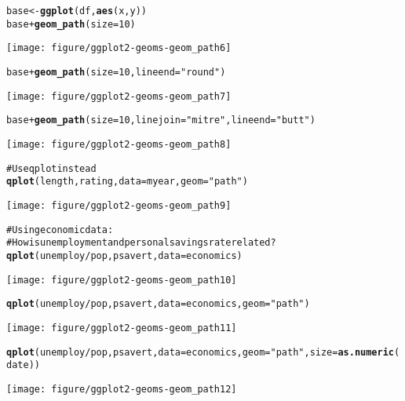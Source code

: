 \documentclass[a4paper,titlepage]{tufte-handout}\usepackage{graphicx, color}
\makeatletter
\def\maxwidth{ %
  \ifdim\Gin@nat@width>\linewidth
    \linewidth
  \else
    \Gin@nat@width
  \fi
}
\newcommand{\hlfunctioncall}[1]{\textcolor[rgb]{0.501960784313725,0,0.329411764705882}{\textbf{#1}}}%
\newcommand{\hlstring}[1]{\textcolor[rgb]{0.6,0.6,1}{#1}}%
\newcommand{\hlcomment}[1]{\textcolor[rgb]{0.180392156862745,0.6,0.341176470588235}{#1}}%
\newenvironment{kframe}{%
 \def\at@end@of@kframe{}%
 \ifinner\ifhmode%
  \def\at@end@of@kframe{\end{minipage}}%
  \begin{minipage}{\columnwidth}%
 \fi\fi%
 \def\FrameCommand##1{\hskip\@totalleftmargin \hskip-\fboxsep
 \colorbox{shadecolor}{##1}\hskip-\fboxsep
     \hskip-\linewidth \hskip-\@totalleftmargin \hskip\columnwidth}%
 \MakeFramed {\advance\hsize-\width
   \@totalleftmargin\z@ \linewidth\hsize
   \@setminipage}}%
 {\par\unskip\endMakeFramed%
 \at@end@of@kframe}
\newenvironment{knitrout}{}{} %
\makeatother
\begin{document}
\begin{knitrout}
\begin{kframe}
\begin{alltt}
base <- \hlfunctioncall{ggplot}(df, \hlfunctioncall{aes}(x, y))
base + \hlfunctioncall{geom_path}(size = 10)
\end{alltt}
\end{kframe}\texttt{[image: figure/ggplot2-geoms-geom\_path6]} \begin{kframe}\begin{alltt}
base + \hlfunctioncall{geom_path}(size = 10, lineend = \hlstring{"round"})
\end{alltt}
\end{kframe}\texttt{[image: figure/ggplot2-geoms-geom\_path7]} \begin{kframe}\begin{alltt}
base + \hlfunctioncall{geom_path}(size = 10, linejoin = \hlstring{"mitre"}, lineend = \hlstring{"butt"})
\end{alltt}
\end{kframe}\texttt{[image: figure/ggplot2-geoms-geom\_path8]} \begin{kframe}\begin{alltt}
\hlcomment{# Use qplot instead}
\hlfunctioncall{qplot}(length, rating, data=myear, geom=\hlstring{"path"})
\end{alltt}
\end{kframe}\texttt{[image: figure/ggplot2-geoms-geom\_path9]} \begin{kframe}\begin{alltt}
\hlcomment{# Using economic data:}
\hlcomment{# How is unemployment and personal savings rate related?}
\hlfunctioncall{qplot}(unemploy/pop, psavert, data=economics)
\end{alltt}
\end{kframe}\texttt{[image: figure/ggplot2-geoms-geom\_path10]} \begin{kframe}\begin{alltt}
\hlfunctioncall{qplot}(unemploy/pop, psavert, data=economics, geom=\hlstring{"path"})
\end{alltt}
\end{kframe}\texttt{[image: figure/ggplot2-geoms-geom\_path11]} \begin{kframe}\begin{alltt}
\hlfunctioncall{qplot}(unemploy/pop, psavert, data=economics, geom=\hlstring{"path"}, size=\hlfunctioncall{as.numeric}(date))
\end{alltt}
\end{kframe}\texttt{[image: figure/ggplot2-geoms-geom\_path12]} \begin{kframe}\begin{alltt}

\end{alltt}
\end{kframe}
\end{knitrout}
\end{document}

